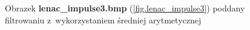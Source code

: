 \documentclass{classrep}
\begin{document}
\begin{figure}
{{  \label{fig.lenac_impulse3_average_5x5}
 }
}
\caption{Obrazek \textbf{lenac\_impulse3.bmp} (\ref{fig.lenac_impulse3}) poddany filtrowaniu z~wykorzystaniem średniej arytmetycznej}
\label{fig.lenac_impulse3_average}
\end{figure}
\end{document}
